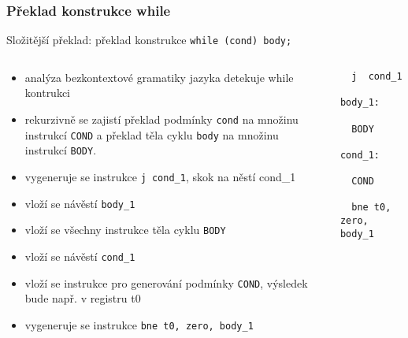 \documentclass{beamer}
\begin{document}
\begin{frame}[fragile]
\frametitle{Překlad konstrukce while}

Složitější překlad: překlad konstrukce \texttt{while (cond) body;}
\begin{columns}
\begin{column}{0.7\textwidth}
\small
\begin{itemize}
 \item analýza bezkontextové gramatiky jazyka detekuje while kontrukci
 \item rekurzivně se zajistí překlad podmínky \texttt{cond} na množinu instrukcí \texttt{COND} a překlad těla cyklu \texttt{body} na množinu instrukcí \texttt{BODY}.
 \item vygeneruje se instrukce \texttt{j cond\_1}, skok na něstí cond\_1
 \item vloží se návěstí \texttt{body\_1}
 \item vloží se všechny instrukce těla cyklu \texttt{BODY}
 \item vloží se návěstí \texttt{cond\_1}
 \item vloží se instrukce pro generování podmínky \texttt{COND}, výsledek bude např. v registru t0
 \item vygeneruje se instrukce \texttt{bne t0, zero, body\_1}
\end{itemize}
\end{column}
\begin{column}{0.3\textwidth}  
\begin{verbatim}
  j  cond_1
    
body_1:

  BODY

cond_1:

  COND
    
  bne t0, zero, body_1
\end{verbatim}
\end{column}
\end{columns}

\end{frame}
\end{document}
